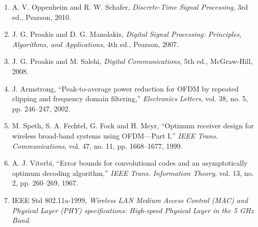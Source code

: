 \documentclass[11pt,a4paper]{report}
\begin{document}
\begin{enumerate}
    \item A. V. Oppenheim and R. W. Schafer, \textit{Discrete-Time Signal Processing}, 3rd ed., Pearson, 2010.
    \item J. G. Proakis and D. G. Manolakis, \textit{Digital Signal Processing: Principles, Algorithms, and Applications}, 4th ed., Pearson, 2007.
    \item J. G. Proakis and M. Salehi, \textit{Digital Communications}, 5th ed., McGraw-Hill, 2008.
    \item J. Armstrong, ``Peak-to-average power reduction for OFDM by repeated clipping and frequency domain filtering,'' \textit{Electronics Letters}, vol. 38, no. 5, pp. 246--247, 2002.
    \item M. Speth, S. A. Fechtel, G. Fock and H. Meyr, ``Optimum receiver design for wireless broad-band systems using OFDM---Part I,'' \textit{IEEE Trans. Communications}, vol. 47, no. 11, pp. 1668--1677, 1999.
    \item A. J. Viterbi, ``Error bounds for convolutional codes and an asymptotically optimum decoding algorithm,'' \textit{IEEE Trans. Information Theory}, vol. 13, no. 2, pp. 260--269, 1967.
    \item IEEE Std 802.11a-1999, \textit{Wireless LAN Medium Access Control (MAC) and Physical Layer (PHY) specifications: High-speed Physical Layer in the 5 GHz Band}.
\end{enumerate}
\end{document}

